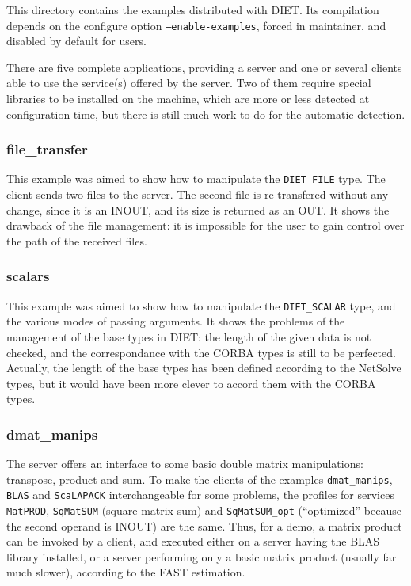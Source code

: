         This directory contains the examples distributed with DIET. Its compilation
        depends on the configure option \texttt{--enable-examples}, forced in
        maintainer, and disabled by default for users.

        There are five complete applications, providing a server and one or several
        clients able to use the service(s) offered by the server. Two of them require
        special libraries to be installed on the machine, which are more or less
        detected at configuration time, but there is still much work to do for
        the automatic detection.

        \subsubsection{file\_transfer}

        This example was aimed to show how to manipulate the \texttt{DIET\_FILE} type.
        The client sends two files to the server. The second file is re-transfered
        without any change, since it is an INOUT, and its size is returned as an OUT.
        It shows the drawback of the file management: it is impossible for the user to
        gain control over the path of the received files.

        \subsubsection{scalars}

        This example was aimed to show how to manipulate the \texttt{DIET\_SCALAR} type,
        and the various modes of passing arguments. It shows the problems of the
        management of the base types in DIET: the length of the given data is not
        checked, and the correspondance with the CORBA types is still to be perfected.
        Actually, the length of the base types has been defined according to the
        NetSolve types, but it would have been more clever to accord them with the CORBA
        types.

        \subsubsection{dmat\_manips}

        The server offers an interface to some basic double matrix manipulations:
        transpose, product and sum. To make the clients of the examples
        \texttt{dmat\_manips}, \texttt{BLAS} and \texttt{ScaLAPACK} interchangeable for
        some problems, the profiles for services \texttt{MatPROD}, \texttt{SqMatSUM}
        (square matrix sum) and \texttt{SqMatSUM\_opt} (``optimized'' because the second
                                                        operand is INOUT) are the same. Thus, for a demo, a matrix product can be
        invoked by a client, and executed either on a server having the BLAS library
        installed, or a server performing only a basic matrix product (usually far much
            slower), according to the FAST estimation.
        \\

